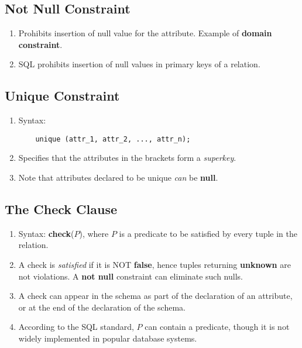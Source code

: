 \documentclass[journal,12pt,twocolumn]{IEEEtran}
\begin{document}
\subsection{Not Null Constraint}
\begin{enumerate}
    \item Prohibits insertion of null value for the attribute. Example of 
    \textbf{domain constraint}.
    \item SQL prohibits insertion of null values in primary keys of a relation.
\end{enumerate}
  
\subsection{Unique Constraint}
\begin{enumerate}
    \item Syntax:
    \begin{lstlisting}
    unique (attr_1, attr_2, ..., attr_n);
    \end{lstlisting}
    \item Specifies that the attributes in the brackets form a \textit{superkey}.
    \item Note that attributes declared to be unique \textit{can} be \textbf{null}.
\end{enumerate}
  
\subsection{The Check Clause}
\begin{enumerate}
    \item Syntax: \textbf{check}($P$), where $P$ is a predicate to be satisfied
    by every tuple in the relation.
    \item A check is \textit{satisfied} if it is NOT \textbf{false}, hence 
    tuples returning \textbf{unknown} are not violations. A \textbf{not null} 
    constraint can eliminate such nulls.
    \item A check can appear in the schema as part of the declaration of an 
    attribute, or at the end of the declaration of the schema.
    \item According to the SQL standard, $P$ can contain a predicate, though it 
    is not widely implemented in popular database systems.
\end{enumerate}
  
\end{document}
